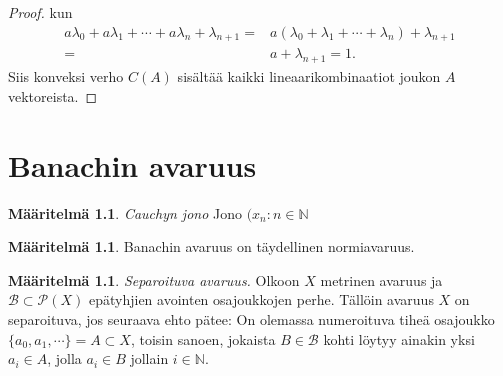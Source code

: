 \documentclass[12pt,a4paper,leqno]{report}
\newcommand{\R}{\mathbb{R}}
\newcommand{\N}{\mathbb{N}}
\theoremstyle{plain}
\theoremstyle{definition}
\newtheorem{maar}[equation]{Määritelmä}
\theoremstyle{remark}
\begin{document}
\begin{proof}
kun 
\begin{equation*}
\begin{split}
a\lambda_0+a\lambda_1+\cdots+ a\lambda_{n}+ \lambda_{n+1}=&a(\lambda_0+\lambda_1+\cdots+ \lambda_{n})+ \lambda_{n+1}\\=&a+ \lambda_{n+1}=1.
\end{split}
\end{equation*} 
Siis konveksi verho $C(A)$ sisältää kaikki lineaarikombinaatiot joukon $A$ vektoreista.



\end{proof}

\chapter{Banachin avaruus}\label{Banach}

\begin{maar}\emph{Cauchyn jono} 
Jono $(x_n\colon n\in \N$

\end{maar}

\begin{maar}Banachin avaruus on täydellinen normiavaruus.
\end{maar}

\begin{maar}\emph{Separoituva avaruus.} Olkoon $X$ metrinen avaruus ja $\mathcal{B}\subset \mathcal{P}( X)$ epätyhjien avointen osajoukkojen perhe. Tällöin avaruus $X$ on separoituva, jos seuraava ehto pätee: On olemassa numeroituva tiheä osajoukko $\{a_0,a_1,\cdots\}=A\subset X$, toisin sanoen, jokaista $B\in\mathcal{B}$ kohti löytyy ainakin yksi $a_i\in A$, jolla $a_i\in B$ jollain $i\in \N$.
\end{maar}
\end{document}
